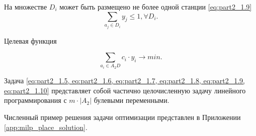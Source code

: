 На множестве $D_i$ может быть размещено не более одной станции \cref{eq:part2_1.9}
\begin{equation}\label{eq:part2_1.9}
    \sum_{a_j \in D_i} y_j \leqslant 1, \forall D_i.
\end{equation}

Целевая функция

\begin{equation}\label{eq:part2_1.10}
    \sum_{a_i \in A_2D} c_i \cdot y_i \to min.
\end{equation}

Задача \cref{eq:part2_1.5, eq:part2_1.6, eq:part2_1.7, eq:part2_1.8, eq:part2_1.9, eq:part2_1.10} представляет собой частично целочисленную задачу линейного программирования с $m \cdot |A_2|$ булевыми переменными.

Численный пример решения задачи оптимизации представлен в Приложении \cref{app:milp_place_solution}.



